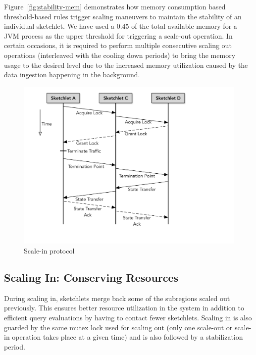 Figure~\ref{fig:stability-mem} demonstrates how memory consumption based threshold-based rules trigger scaling maneuvers to maintain the stability of an individual sketchlet.
We have used a 0.45 of the total available memory for a JVM process as the upper threshold for triggering a scale-out operation.
In certain occasions, it is required to perform multiple consecutive scaling out operations (interleaved with the cooling down periods) to bring the memory usage to the desired level due to the increased memory utilization caused by the data ingestion happening in the background.

%
%
\begin{figure}[b!]
    \centering
    \includegraphics[scale=0.4, valign=t]{figures/scale-in.pdf} 
    \caption{Scale-in protocol}
    \label{fig:scale-in-protocol}
\end{figure}
\subsection{Scaling In: Conserving Resources}
\label{subsec:scaling-in}
During scaling in, sketchlets merge back some of the subregions scaled out previously.
This ensures better resource utilization in the system in addition to efficient query evaluations by having to contact fewer sketchlets.
Scaling in is also guarded by the same mutex lock used for scaling out (only one scale-out or scale-in operation takes place at a given time) and is also followed by a stabilization period.


